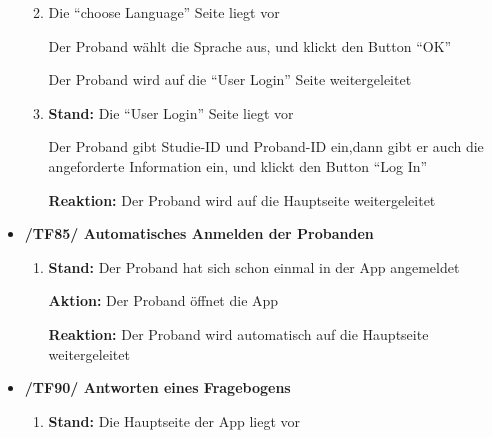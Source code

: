 \documentclass[a4paper]{scrreprt}
\begin{document}
\begin{itemize}
\begin{enumerate}
                        \par \textbf{{\color{blue}{Reaktion: }}} {\color{blue}{Die App wechselt auf die ``choose Language'' Seite}}
                        \item \par \textbf{{\color{blue}{Stand: }}}{\color{blue} Die ``choose Language'' Seite liegt vor}
                        \par \textbf{{\color{blue}{Aktion: }}}{\color{blue}Der Proband wählt die Sprache aus, und klickt den Button ``OK''}
                        \par \textbf{{\color{blue}{Reaktion: }}}{\color{blue}Der Proband wird auf die ``User Login'' Seite weitergeleitet}
                        \item \par \textbf{Stand: }Die ``User Login'' Seite liegt vor
                        \par \textbf{{}}{}
                        \par \textbf{{\color{blue}{Aktion: }}}{\color{blue}Der Proband gibt Studie-ID und Proband-ID ein,dann gibt er auch die angeforderte Information ein, und klickt den Button ``Log In''}
                        \par \textbf{Reaktion: }Der Proband wird auf die Hauptseite weitergeleitet
                  \end{enumerate}
                  \item \textbf{/TF85/ Automatisches Anmelden der Probanden}
	              \begin{enumerate}
	        	        \item \par \textbf{Stand: }Der Proband hat sich schon einmal in der App angemeldet
	        	        \par \textbf{Aktion: }Der Proband öffnet die App
	        	        \par \textbf{Reaktion: }Der Proband wird automatisch auf die Hauptseite weitergeleitet
	              \end{enumerate}
                  \item \textbf{/TF90/ Antworten eines Fragebogens}
	              \begin{enumerate}
                        \item \par \textbf{Stand: }Die Hauptseite der App liegt vor

\end{enumerate}
\end{itemize}
\end{document}
